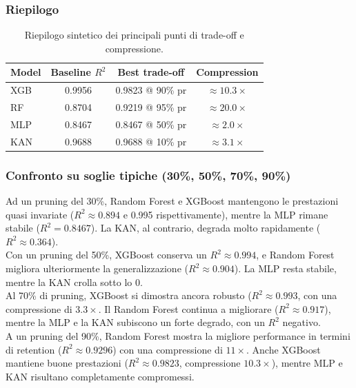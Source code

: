 \documentclass[a4paper,12pt]{report}
\begin{document}
	\subsubsection{Riepilogo}
	\begin{table}[H]
		\centering
		\setlength{\tabcolsep}{2pt}
		\begin{tabular}{lccc}
			\toprule
			\textbf{Model} & \textbf{Baseline \(R^2\)} & \textbf{Best trade-off} & \textbf{Compression} \\
			\midrule
			XGB           & 0.9956 & 0.9823 @ 90\% pr & \(\approx 10.3\times\) \\
			RF            & 0.8704 & 0.9219 @ 95\% pr & \(\approx 20.0\times\) \\
			MLP           & 0.8467 & 0.8467 @ 50\% pr & \(\approx 2.0\times\) \\
			KAN           & 0.9688 & 0.9688 @ 10\% pr & \(\approx 3.1\times\) \\
			\bottomrule
		\end{tabular}
		\caption{Riepilogo sintetico dei principali punti di trade-off e compressione.}
	\end{table}
	
	\subsubsection{Confronto su soglie tipiche (30\%, 50\%, 70\%, 90\%)}
	Ad un pruning del 30\%, Random Forest e XGBoost mantengono le prestazioni quasi invariate (\(R^2 \approx 0.894\) e 0.995 rispettivamente), mentre la MLP rimane stabile (\(R^2 = 0.8467\)). La KAN, al contrario, degrada molto rapidamente (\(R^2 \approx 0.364\)). \\
	Con un pruning del 50\%, XGBoost conserva un \(R^2 \approx 0.994\), e Random Forest migliora ulteriormente la generalizzazione (\(R^2 \approx 0.904\)). La MLP resta stabile, mentre la KAN crolla sotto lo 0. \\
	Al 70\% di pruning, XGBoost si dimostra ancora robusto (\(R^2 \approx 0.993\), con una compressione di $3.3\times$. Il Random Forest continua a migliorare (\(R^2 \approx 0.917\)), mentre la MLP e la KAN subiscono un forte degrado, con un $R^2$ negativo. \\
	A un pruning del 90\%, Random Forest mostra la migliore performance in termini di retention (\(R^2 \approx 0.9296\)) con una compressione di $11\times$. Anche XGBoost mantiene buone prestazioni (\(R^2 \approx 0.9823\), compressione $10.3\times$), mentre MLP e KAN risultano completamente compromessi.
	
\end{document}
